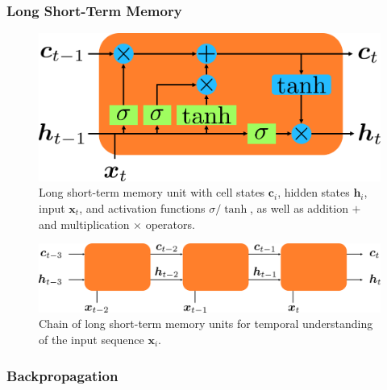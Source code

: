 \subsubsection{Long Short-Term Memory}
\cite{hochreiter1997long} %
\begin{figure}[h]
	\centering
	\includegraphics[scale=.28]{chapters/03_background/img/lstm.png}
	\caption{Long short-term memory unit with cell states $\bm{c}_i$, hidden states $\bm{h}_i$, input $\bm{x}_t$, and activation functions $\sigma/\tanh$, as well as addition $+$ and multiplication $\times$ operators.}
	\label{fig::321_lstm}
\end{figure}
\begin{figure}[h]
	\centering
	\includegraphics[scale=.28]{chapters/03_background/img/lstm_chain.png}
	\caption{Chain of long short-term memory units for temporal understanding of the input sequence $\bm{x}_i$.}
	\label{fig::321_lstm_chain}
\end{figure}
\subsubsection{Backpropagation}
\cite{linnainmaa1970representation}